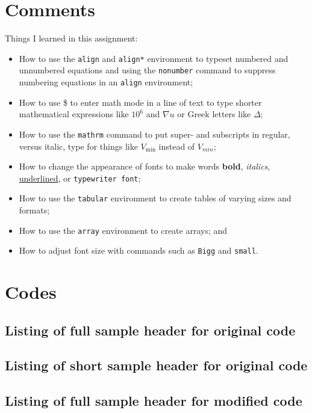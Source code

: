 \documentclass{article}
\begin{document}
\section{Comments} %
Things I learned in this assignment:
\begin{itemize}
\item How to use the \texttt{align} and \texttt{align*} environment to typeset numbered and unnumbered equations and using the \texttt{nonumber} command to suppress numbering equations in an  \texttt{align} environment;
\item How to use \$ to enter math mode in a line of text to type shorter mathematical expressions like $10^6$ and $\nabla u$ or Greek letters like $\Delta$;
\item How to use the \texttt{mathrm} command to put super- and subscripts in regular, versus italic, type for things like $V_{\mathrm{min}}$ instead of $V_{min}$;
\item How to change the appearance of fonts to make words \textbf{bold}, \textit{italics}, \underline{underlined}, or \texttt{typewriter font};
\item How to use the \texttt{tabular} environment to create tables of varying sizes and formats;
\item How to use the \texttt{array} environment to create arrays; and
\item How to adjust font size with commands such as \texttt{Bigg} and \texttt{small}.
\end{itemize}
\pagebreak
\appendix
\section{Codes}
\subsection{Listing of full sample header for original code}

\subsection{Listing of short sample header for original code}

\subsection{Listing of full sample header for modified code}
\end{document}

